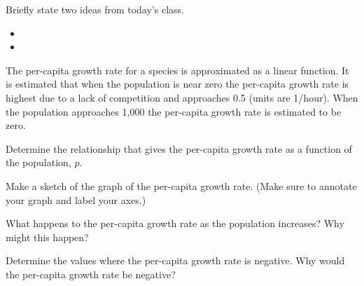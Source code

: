 \begin{problem}
\item Briefly state two ideas from today's class.
  \begin{itemize}
  \item 
  \item 
  \end{itemize}
\item The per-capita growth rate for a species is approximated as a
  linear function. It is estimated that when the population is near
  zero the per-capita growth rate is highest due to a lack of
  competition and approaches 0.5 (units are 1/hour). When the
  population approaches 1,000 the per-capita growth rate is estimated
  to be zero. 
  \begin{subproblem}
    \item Determine the relationship that gives the per-capita growth
      rate as a function of the population, $p$.
    \item Make a sketch of the graph of the per-capita growth
      rate. (Make sure to annotate your graph and label your axes.)
    \item What happens to the per-capita growth rate as the population
      increases? Why might this happen?
    \item Determine the values where the per-capita growth rate is
      negative. Why would the per-capita growth rate be negative?
  \end{subproblem}
\end{problem}


